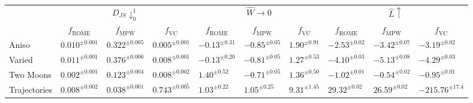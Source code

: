 \begin{tabularx}{\textwidth}{X | Y Y Y | Y Y Y | Y Y Y}
\toprule[1pt] 
&  &  &   \\&  &  &  &  &  &  &  &  &   \\ \midrule[1pt]
Aniso & {\scriptsize $0.010^{\pm 0.001}$} & {\scriptsize $0.322^{\pm 0.005}$} & {\scriptsize $0.005^{\pm 0.001}$} & {\scriptsize $-0.13^{\pm 0.31}$} & {\scriptsize $-0.85^{\pm 0.05}$} & {\scriptsize $1.90^{\pm 0.91}$} & {\scriptsize $-2.53^{\pm 0.02}$} & {\scriptsize $-3.42^{\pm 0.07}$} & {\scriptsize $-3.19^{\pm 0.02}$}  \\ \midrule 
Varied & {\scriptsize $0.011^{\pm 0.001}$} & {\scriptsize $0.376^{\pm 0.006}$} & {\scriptsize $0.008^{\pm 0.001}$} & {\scriptsize $-0.13^{\pm 0.20}$} & {\scriptsize $-0.81^{\pm 0.05}$} & {\scriptsize $1.27^{\pm 0.53}$} & {\scriptsize $-4.10^{\pm 0.03}$} & {\scriptsize $-5.13^{\pm 0.08}$} & {\scriptsize $-4.29^{\pm 0.03}$}  \\ \midrule 
Two Moons & {\scriptsize $0.002^{\pm 0.001}$} & {\scriptsize $0.123^{\pm 0.004}$} & {\scriptsize $0.008^{\pm 0.002}$} & {\scriptsize $1.40^{\pm 0.52}$} & {\scriptsize $-0.71^{\pm 0.05}$} & {\scriptsize $1.36^{\pm 0.50}$} & {\scriptsize $-1.02^{\pm 0.01}$} & {\scriptsize $-0.54^{\pm 0.02}$} & {\scriptsize $-0.95^{\pm 0.01}$}  \\ \midrule 
Trajectories & {\scriptsize $0.008^{\pm 0.002}$} & {\scriptsize $0.038^{\pm 0.001}$} & {\scriptsize $0.743^{\pm 0.005}$} & {\scriptsize $1.03^{\pm 0.22}$} & {\scriptsize $1.05^{\pm 0.25}$} & {\scriptsize $9.31^{\pm 1.45}$} & {\scriptsize $29.32^{\pm 0.02}$} & {\scriptsize $26.59^{\pm 0.02}$} & {\scriptsize $-215.76^{\pm 17.4}$}  \\ \bottomrule[1pt]
\end{tabularx} 

